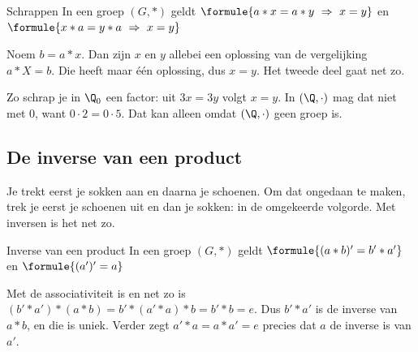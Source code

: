 
\begin{theorie}
\begin{stelling}{Schrappen}
In een groep $(G, \ast)$ geldt \quad $\formule{a \ast x = a \ast y \ \Rightarrow \ x = y}$ \quad en \quad $\formule{x \ast a = y \ast a \ \Rightarrow \ x = y}$
\end{stelling}

\begin{bewijs}
Noem $b = a \ast x$. Dan zijn $x$ en $y$ allebei een oplossing van de vergelijking $a \ast X = b$. Die heeft maar één oplossing, dus $x = y$. Het tweede deel gaat net zo.
\end{bewijs}
\end{theorie}

Zo schrap je in $\Q_0$ een factor: uit $3x = 3y$ volgt $x = y$. In $(\Q, \cdot)$ mag dat niet met 0, want $0 \cdot 2 = 0 \cdot 5$. Dat kan alleen omdat $(\Q, \cdot)$ geen groep is.

\subsection{De inverse van een product}

Je trekt eerst je sokken aan en daarna je schoenen. Om dat ongedaan te maken, trek je eerst je schoenen uit en dan je sokken: in de omgekeerde volgorde. Met inversen is het net zo.

\begin{theorie}
\begin{stelling}{Inverse van een product}
In een groep $(G, \ast)$ geldt \quad $\formule{(a \ast b)' = b' \ast a'}$ \quad en \quad $\formule{(a')' = a}$
\end{stelling}

\begin{bewijs}
Met de associativiteit is
en net zo is $(b' \ast a') \ast (a \ast b) = b' \ast (a' \ast a) \ast b = b' \ast b = e$. Dus $b' \ast a'$ is de inverse van $a \ast b$, en die is uniek. Verder zegt $a' \ast a = a \ast a' = e$ precies dat $a$ de inverse is van $a'$.
\end{bewijs}
\end{theorie}

